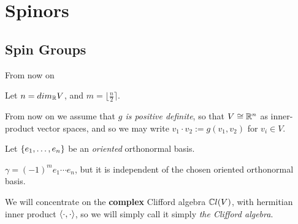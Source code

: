 \section{Spinors}

\subsection{Spin Groups}

\begin{frame}{From now on} %

    Let $n = dim_\mathbb R V$, and $m = \lfloor \frac{n}{2} \rceil$.

    From now on we assume that \emph{$g$ is positive definite}, so that $V \cong \mathbb R^n$ as inner-product vector spaces, and so we may write $v_1 \cdot v_2 := g(v_1, v_2)$ for $v_i \in V$. %
    
    Let $\{e_1, \dots, e_n\}$ be an \emph{oriented} orthonormal basis.
    
    $\gamma = (-1)^m e_1 \cdots e_n$, but it is independent of the chosen oriented orthonormal basis. %

    We will concentrate on the \textbf{complex} Clifford algebra $\mathbb C l(V)$, with hermitian inner product $\langle \cdot , \cdot \rangle$, so we will simply call it simply \emph{the Clifford algebra}.%
    
\end{frame}

